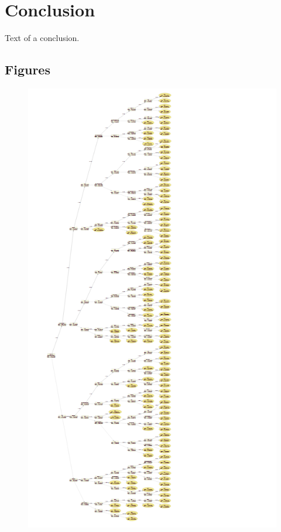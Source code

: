 \documentclass[12pt, twoside,openany]{book} %
\begin{document}
\chapter*{Conclusion}          %

Text of a conclusion.





\begin{appendices}
\chapter{Figures}

\begin{figure}[ht]
\small{

\includegraphics[width=\textwidth, height=\dimexpr
  \textheight-4\baselineskip-\parskip-.2em-
  \abovecaptionskip-\belowcaptionskip\relax]{ml1_dtree_full.png}

}
\end{figure}
\end{appendices}
\end{document}
